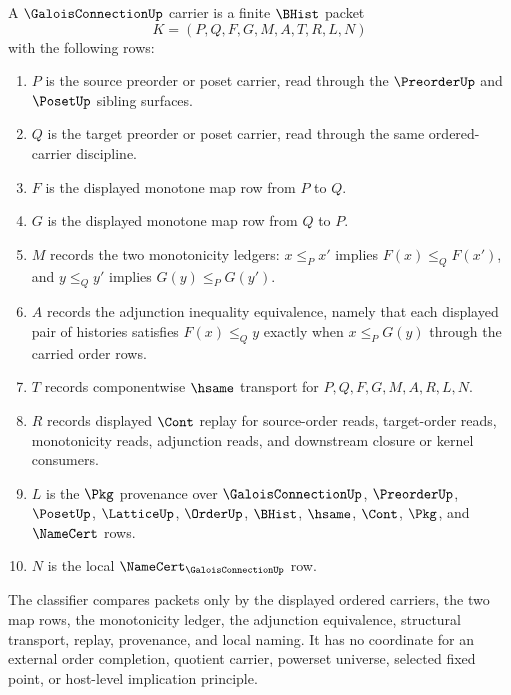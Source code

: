 \begin{definition}
\label{def:galois-connection-carrier}
A $\GaloisConnectionUp$ carrier is a finite $\BHist$ packet
$$
K=(P,Q,F,G,M,A,T,R,L,N)
$$
with the following rows:
\begin{enumerate}
\item $P$ is the source preorder or poset carrier, read through the $\PreorderUp$ and $\PosetUp$ sibling surfaces.
\item $Q$ is the target preorder or poset carrier, read through the same ordered-carrier discipline.
\item $F$ is the displayed monotone map row from $P$ to $Q$.
\item $G$ is the displayed monotone map row from $Q$ to $P$.
\item $M$ records the two monotonicity ledgers: $x\leq_P x'$ implies $F(x)\leq_Q F(x')$, and $y\leq_Q y'$ implies $G(y)\leq_P G(y')$.
\item $A$ records the adjunction inequality equivalence, namely that each displayed pair of histories satisfies $F(x)\leq_Q y$ exactly when $x\leq_P G(y)$ through the carried order rows.
\item $T$ records componentwise $\hsame$ transport for $P,Q,F,G,M,A,R,L,N$.
\item $R$ records displayed $\Cont$ replay for source-order reads, target-order reads, monotonicity reads, adjunction reads, and downstream closure or kernel consumers.
\item $L$ is the $\Pkg$ provenance over $\GaloisConnectionUp$, $\PreorderUp$, $\PosetUp$, $\LatticeUp$, $\OrderUp$, $\BHist$, $\hsame$, $\Cont$, $\Pkg$, and $\NameCert$ rows.
\item $N$ is the local $\NameCert_{\GaloisConnectionUp}$ row.
\end{enumerate}
The classifier compares packets only by the displayed ordered carriers, the two map rows, the monotonicity ledger, the adjunction equivalence, structural transport, replay, provenance, and local naming. It has no coordinate for an external order completion, quotient carrier, powerset universe, selected fixed point, or host-level implication principle.
\end{definition}

